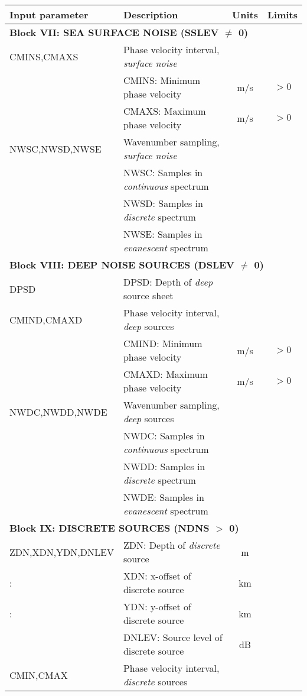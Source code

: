 \begin{table}
\begin{center}
\small
\begin{tabular}{|l|l|c|c|}
\hline \hline
Input parameter & Description & Units & Limits \\
\hline \hline
\multicolumn{4}{|l|}{\bf Block VII: SEA SURFACE NOISE (SSLEV $\neq$ 0)}  \\ 
\hline
CMINS,CMAXS & Phase velocity interval, {\em surface noise} & & \\ 
	& CMINS: Minimum phase velocity & m/s & $>0$ \\
	& CMAXS: Maximum phase velocity & m/s & $>0$ \\
NWSC,NWSD,NWSE & Wavenumber sampling, {\em surface noise} & & \\
	& NWSC: Samples in {\em continuous} spectrum &  &  \\
	& NWSD: Samples in {\em discrete} spectrum &  &  \\
	& NWSE: Samples in {\em evanescent} spectrum &  &  \\
\hline
\multicolumn{4}{|l|}{\bf Block VIII: DEEP NOISE SOURCES (DSLEV $\neq$ 0)}  \\ 
\hline
DPSD 	& DPSD: Depth of {\em deep} source sheet & & \\
CMIND,CMAXD & Phase velocity interval, {\em deep} sources & & \\ 
	& CMIND: Minimum phase velocity & m/s & $>0$ \\
	& CMAXD: Maximum phase velocity & m/s & $>0$ \\
NWDC,NWDD,NWDE & Wavenumber sampling, {\em deep} sources & & \\
	& NWDC: Samples in {\em continuous} spectrum &  &  \\
	& NWDD: Samples in {\em discrete} spectrum &  &  \\
	& NWDE: Samples in {\em evanescent} spectrum &  &  \\
\hline
\multicolumn{4}{|l|}{\bf Block IX: DISCRETE SOURCES (NDNS $>$ 0)}  \\ 
\hline
ZDN,XDN,YDN,DNLEV & ZDN: Depth of {\em discrete} source & m & \\
:	& XDN: x-offset of discrete source & km & \\ 
:	& YDN: y-offset of discrete source & km & \\
	& DNLEV: Source level of discrete source & dB & \\
CMIN,CMAX & Phase velocity interval, {\em discrete} sources & & \\ 

\end{tabular}
\end{center}
\end{table}
